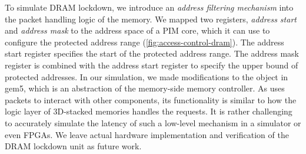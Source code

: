 
To simulate DRAM lockdown, we introduce an \emph{address filtering mechanism} into the packet handling logic of the memory. We mapped two registers, \emph{address start} and \emph{address mask} to the address space of a PIM core, which it can use to configure the protected address range (\autoref{fig:access-control-dram}). The address start register specifies the start of the protected address range. The address mask register is combined with the address start register to specify the upper bound of protected addresses. In our simulation, we made modifications to the  object in gem5, which is an abstraction of the memory-side memory controller. As  uses packets to interact with other components, its functionality is similar to how the logic layer of 3D-stacked memories handles the requests.
It is rather challenging to accurately simulate the latency of such a low-level mechanism in a simulator or even FPGAs. We leave actual hardware implementation and verification of the DRAM lockdown unit as future work. 



